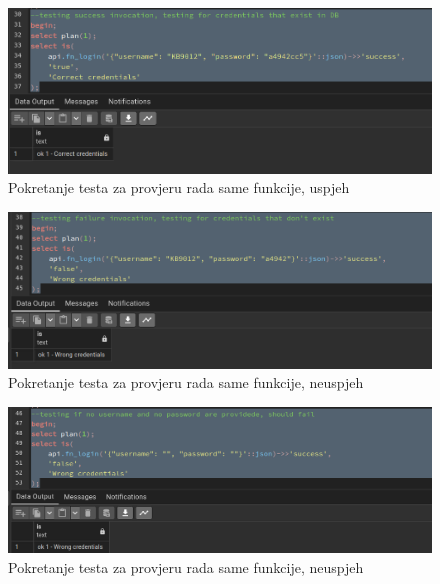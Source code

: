				\begin{figure}[H]
					\centering
					\includegraphics[width=\textwidth]{slike/unit_tests/ut_1/success_login.png}
					\caption{Pokretanje testa za provjeru rada same funkcije, uspjeh}
					\label{fig: IS1-uspješni login}
				\end{figure}
				\begin{figure}[H]
					\centering
					\includegraphics[width=\textwidth]{slike/unit_tests/ut_1/failure_login.png}
					\caption{Pokretanje testa za provjeru rada same funkcije, neuspjeh}
					\label{fig: IS1-neuspješni login}
				\end{figure}
				\begin{figure}[H]
					\centering
					\includegraphics[width=\textwidth]{slike/unit_tests/ut_1/no_creds.png}
					\caption{Pokretanje testa za provjeru rada same funkcije, neuspjeh}
					\label{fig: IS1-login bez vjerodajnica}
				\end{figure}
